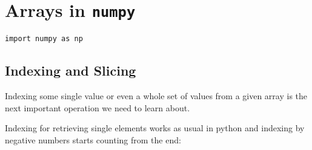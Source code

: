 \documentclass[numpymain.tex]{subfiles}
\begin{document}
\section{Arrays in \texttt{numpy} }


\begin{framed}
\begin{verbatim}
import numpy as np
\end{verbatim}
\end{framed}

\subsection{Indexing and Slicing}
Indexing some single value or even a whole set of values from a given array is the next important operation we need to learn about.

Indexing for retrieving single elements works as usual in python and indexing by negative numbers starts counting from the end:
\end{document}
